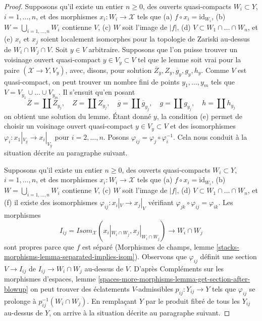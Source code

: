 \begin{proof}
\medskip\noindent
Supposons qu'il existe un entier $n \geq 0$, des ouverts quasi-compacts
$W_i \subset Y$, $i = 1, \ldots, n$, et des
morphismes $x_i : W_i \to \mathcal{X}$ tels que
(a) $f \circ x_i = \text{id}_{W_i}$,
(b) $W = \bigcup_{i = 1, \ldots, n} W_i$ contienne $V$,
(c) $W$ soit l'image de $|f|$,
(d) $V \subset W_1 \cap \ldots \cap W_n$, et
(e) $x_i$ et $x_j$ soient localement isomorphes pour la topologie de Zariski au-dessus de $W_i \cap W_j \cap V$.
Soit $y \in V$ arbitraire.
Supposons que l'on puisse trouver un voisinage ouvert quasi-compact
$y \in V_y \subset V$ tel que le lemme soit vrai pour
la paire $(\mathcal{X} \to Y, V_y)$, avec, disons, pour solution
$\overline{Z}_y, Z_y, \overline{g}_y, g_y, h_y$.
Comme $V$ est quasi-compact, on peut trouver un nombre fini de points
$y_1, \ldots, y_m$ tels que $V = V_{y_1} \cup \ldots \cup V_{y_m}$.
Il s'ensuit qu'en posant
$$
\overline{Z} = \coprod \overline{Z}_{y_j},\quad
Z = \coprod Z_{y_j},\quad
\overline{g} = \coprod \overline{g}_{y_j},\quad
g = \coprod g_{y_j},\quad
h = \coprod h_{y_j}
$$
on obtient une solution du lemme. Étant donné $y$, la condition (e)
permet de choisir un voisinage ouvert quasi-compact $y \in V_y \subset V$
et des isomorphismes $\varphi_i : x_1|_{V_y} \to x_i|_{V_y}$ pour
$i = 2, \ldots, n$. Posons $\varphi_{ij} = \varphi_j \circ \varphi_i^{-1}$.
Cela nous conduit à la situation décrite au paragraphe suivant.

\medskip\noindent
Supposons qu'il existe un entier $n \geq 0$, des ouverts quasi-compacts
$W_i \subset Y$, $i = 1, \ldots, n$, et des
morphismes $x_i : W_i \to \mathcal{X}$ tels que
(a) $f \circ x_i = \text{id}_{W_i}$,
(b) $W = \bigcup_{i = 1, \ldots, n} W_i$ contienne $V$,
(c) $W$ soit l'image de $|f|$,
(d) $V \subset W_1 \cap \ldots \cap W_n$, et
(f) il existe des isomorphismes $\varphi_{ij} : x_i|_V \to x_j|_V$
vérifiant $\varphi_{jk} \circ \varphi_{ij} = \varphi_{ik}$.
Les morphismes
$$
I_{ij} = \mathit{Isom}_\mathcal{X}(x_i|_{W_i \cap W_j},
x_j|_{W_i \cap W_j}) \longrightarrow W_i \cap W_j
$$
sont propres parce que $f$ est séparé
(Morphismes de champs, lemme
\ref{stacks-morphisms-lemma-separated-implies-isom}).
Observons que $\varphi_{ij}$ définit une section $V \to I_{ij}$
de $I_{ij} \to W_i \cap W_j$ au-dessus de $V$.
D'après Compléments sur les morphismes d'espaces, lemme
\ref{spaces-more-morphisms-lemma-get-section-after-blowup}
on peut trouver des éclatements $V$-admissibles
$p_{ij} : Y_{ij} \to Y$ tels que $\varphi_{ij}$
se prolonge à $p_{ij}^{-1}(W_i \cap W_j)$.
En remplaçant $Y$ par le produit fibré de tous les $Y_{ij}$
au-dessus de $Y$, on arrive à la situation décrite au paragraphe suivant.


\end{proof}
